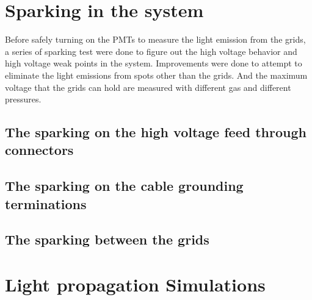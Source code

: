 \section{Sparking in the system}
Before safely turning on the PMTs to measure the light emission from the grids, a series of sparking test were done to figure out the high voltage behavior and high voltage weak points in the system. Improvements were done to attempt to eliminate the light emissions from spots other than the grids. And the maximum voltage that the grids can hold are measured with different gas and different pressures.

\subsection{The sparking on the high voltage feed through connectors}

\subsection{The sparking on the cable grounding terminations}

\subsection{The sparking between the grids}


\section{Light propagation Simulations}
